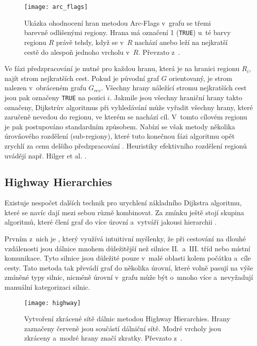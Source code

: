 \begin{figure}[htbp]
	\centering
	\texttt{[image: arc\_flags]}
	\caption[Ukázka ohodnocení hran metodou Arc-Flags.]{Ukázka ohodnocení hran metodou Arc-Flags v~grafu se třemi barevně odlišenými regiony. Hrana má označení 1 (\texttt{TRUE}) u~té barvy regionu \(R\) právě tehdy, když se v~\(R\) nachází anebo leží na nejkratší cestě do alespoň jednoho vrcholu v~\(R\). Převzato z~\cite{Delling2009enginneringRoute}.}
	\label{pic:arc_flags}
\end{figure}

Ve fázi předzpracování je nutné pro každou hranu, která je na hranici regionu $R_i$, najít strom nejkratších cest. Pokud je původní graf $G$ orientovaný, je strom nalezen v~obráceném grafu $G_{rev}$. Všechny hrany náležící stromu nejkratších cest jsou pak označeny \texttt{TRUE} na pozici $i$. Jakmile jsou všechny hraniční hrany takto označeny, Dijkstrův algoritmus při vyhledávání může vyřadit všechny hrany, které zaručeně nevedou do regionu, ve kterém se nachází cíl. V~tomto cílovém regionu je pak postupováno standardním způsobem. Nabízí se však metody několika úrovňového rozdělení (sub-regiony), které tuto konečnou fázi algoritmu opět zrychlí za cenu delšího předzpracování \cite{mohring2005partitioning}. Heuristiky efektivního rozdělení regionů uvádějí např. Hilger et al. \cite{hilger2008fast}.

\subsection{Highway Hierarchies}
Existuje nespočet dalších technik pro urychlení základního Dijkstra algoritmu, které se navíc dají mezi sebou různě kombinovat. Za zmínku ještě stojí skupina algoritmů, které člení graf do více úrovní a~vytváří jakousi hierarchii \cite{sanders05HHHasten}. 

Prvním z~nich je , který využívá intuitivní myšlenky, že při cestování na dlouhé vzdálenosti jsou dálnice mnohem důležitější než silnice II.~a~III. tříd nebo místní komunikace. Tyto silnice jsou důležité pouze v~malé oblasti kolem počátku a~cíle cesty. Tato metoda tak převádí graf do několika úrovní, které volně pasují na výše zmíněné typy silnic, nicméně úrovní v~grafu může být o~mnoho více a~nevyžadují manuální kategorizaci silnic.

\begin{figure}[htbp]
	\centering
	\texttt{[image: highway]}
	\caption[Vytvoření zkrácené sítě dálnic metodou Highway Hierarchies.]{Vytvoření zkrácené sítě dálnic metodou Highway Hierarchies. Hrany zaznačeny \textcolor{red!75}{červeně} jsou součástí dálniční sítě. \textcolor{blue!75}{Modré vrcholy} jsou zkráceny a~\textcolor{blue!75}{modré hrany} značí zkratky. Převzato z~\cite{SchultesHHMaster}.}
	\label{pic:highway}
\end{figure}

